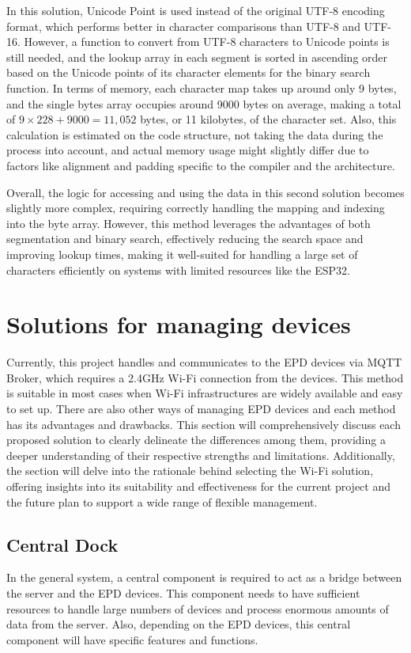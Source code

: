 \documentclass[../Main.tex]{subfiles}
\begin{document}
In this solution, Unicode Point is used instead of the original UTF-8 encoding format, which performs better in character comparisons than UTF-8 and UTF-16. However, a function to convert from UTF-8 characters to Unicode points is still needed, and the lookup array in each segment is sorted in ascending order based on the Unicode points of its character elements for the binary search function. In terms of memory, each character map takes up around only 9 bytes, and the single bytes array occupies around 9000 bytes on average, making a total of \(9\times228+9000=11,052\) bytes, or 11 kilobytes, of the character set. Also, this calculation is estimated on the code structure, not taking the data during the process into account, and actual memory usage might slightly differ due to factors like alignment and padding specific to the compiler and the architecture.

Overall, the logic for accessing and using the data in this second solution becomes slightly more complex, requiring correctly handling the mapping and indexing into the byte array. However, this method leverages the advantages of both segmentation and binary search, effectively reducing the search space and improving lookup times, making it well-suited for handling a large set of characters efficiently on systems with limited resources like the ESP32.

\section{Solutions for managing devices}
Currently, this project handles and communicates to the \gls{EPD} devices via MQTT Broker, which requires a 2.4GHz Wi-Fi connection from the devices. This method is suitable in most cases when Wi-Fi infrastructures are widely available and easy to set up. There are also other ways of managing \gls{EPD} devices and each method has its advantages and drawbacks. This section will comprehensively discuss each proposed solution to clearly delineate the differences among them, providing a deeper understanding of their respective strengths and limitations. Additionally, the section will delve into the rationale behind selecting the Wi-Fi solution, offering insights into its suitability and effectiveness for the current project and the future plan to support a wide range of flexible management.

\subsection{Central Dock}
In the general system, a central component is required to act as a bridge between the server and the \gls{EPD} devices. This component needs to have sufficient resources to handle large numbers of devices and process enormous amounts of data from the server. Also, depending on the \gls{EPD} devices, this central component will have specific features and functions.
\end{document}
